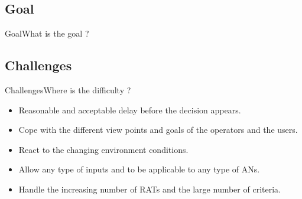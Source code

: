 \subsection*{Goal}
\begin{frame}{Goal}{What is the goal ?}

\end{frame}


\subsection*{Challenges}
\begin{frame}[bg]{Challenges}{Where is the difficulty ?}
\begin{itemize}
	\item Reasonable and acceptable delay before the decision appears.
	\item Cope with the different view points and goals of the operators and the users.
	\item React to the changing environment conditions.
	\item Allow any type of inputs and to be applicable to any type of ANs.
	\item Handle the increasing number of RATs and the large number of criteria.
\end{itemize}

\end{frame}




